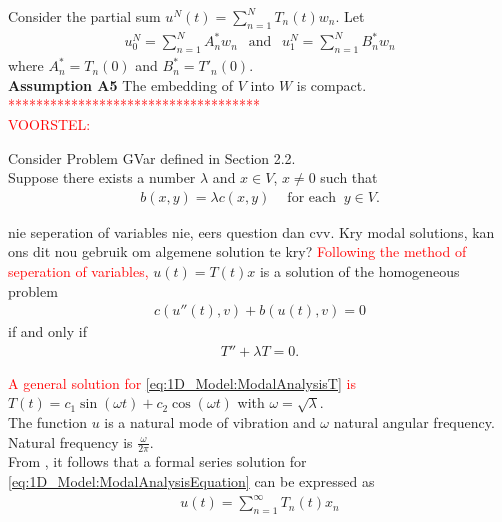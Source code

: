 \documentclass[../../main.tex]{subfiles}
\begin{document}
Consider the partial sum $u^{N}(t) = \sum_{n=1}^{N} T_{n}(t)w_n$. Let
\begin{eqnarray*}
	u_0^{N} = \sum_{n=1}^{N} A^*_n w_n \ \ \textrm{ and } \ \ u_{1}^{N} =\sum_{n=1}^{N} B^*_n w_n
\end{eqnarray*} where $A^*_n = T_n(0)$ and $B^*_n = T'_n(0)$.\\

\textbf{Assumption A5} The embedding of $V$ into $W$ is compact.\\


\textcolor{red}{************************************}\\
\textcolor{red}{VOORSTEL:}

Consider Problem GVar defined in Section 2.2.\\

Suppose there exists a number $\lambda$ and $x \in V$, $x \neq 0$ such that
\begin{eqnarray}
	b(x,y) = \lambda c(x,y) \ \ \ \ \textrm{ for each } \ y \in V. \label{eq:1D_Model:ModalAnalysisEquation}
\end{eqnarray}

nie seperation of variables nie, eers question dan cvv. Kry modal solutions, kan ons dit nou gebruik om algemene solution te kry?
\textcolor{red}{Following the method of seperation of variables,} $u(t) = T(t)x$ is a solution of the homogeneous problem
\begin{eqnarray}
	c(u''(t),v) + b(u(t),v) = 0
\end{eqnarray}
if and only if
\begin{eqnarray}
	T''  + \lambda T = 0. \label{eq:1D_Model:ModalAnalysisT1}
\end{eqnarray}

\textcolor{red}{A general solution for \eqref{eq:1D_Model:ModalAnalysisT} is} $T(t) = c_1 \sin(\omega t) + c_2 \cos(\omega t)$ with $\omega = \sqrt{\lambda}$.\\

The function $u$ is a natural mode of vibration and $\omega$ natural angular frequency. Natural frequency is $\frac{\omega}{2 \pi}$.\\

From \cite{CVV18}, it follows that a formal series solution for \eqref{eq:1D_Model:ModalAnalysisEquation} can be expressed as
\begin{eqnarray}
	u(t) = \sum_{n=1}^{\infty} T_n(t)x_n \label{eq:1D_Model:ModalAnalysisSeriesSolution}
\end{eqnarray}
\end{document}
